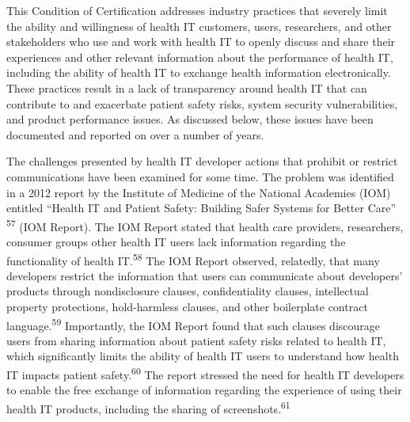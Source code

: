 \documentclass[twoside,11pt]{article}
\begin{document}
          This Condition of Certification addresses industry practices that severely limit the ability and willingness of health IT customers, users, researchers, and other stakeholders who use and work with health IT to openly discuss and share their experiences and other relevant information about the performance of health IT, including the ability of health IT to exchange health information electronically. These practices result in a lack of transparency around health IT that can contribute to and exacerbate patient safety risks, system security vulnerabilities, and product performance issues. As discussed below, these issues have been documented and reported on over a number of years.



          The challenges presented by health IT developer actions that prohibit or  \ifhmode\expandafter\xspace\fi restrict communications have been examined for some time. The problem was identified in a 2012 report by the Institute of Medicine of the National Academies (IOM) entitled “Health IT and Patient Safety: Building Safer Systems for Better Care” \textsuperscript{57}
             (IOM Report). The IOM Report stated that health care providers, researchers, consumer groups other health IT users lack information regarding the functionality of health IT.\textsuperscript{58}
             The IOM Report observed, relatedly, that many developers restrict the information that users can communicate about developers' products through nondisclosure clauses, confidentiality clauses, intellectual property protections, hold-harmless clauses, and other boilerplate contract language.\textsuperscript{59}
             Importantly, the IOM Report found that such clauses discourage users from sharing information about patient safety risks related to health IT, which significantly limits the ability of health IT users to understand how health IT impacts patient safety.\textsuperscript{60}
             The report stressed the need for health IT developers to enable the free exchange of information regarding the experience of using their health IT products, including the sharing of screenshots.\textsuperscript{61}
            
          


\end{document}
